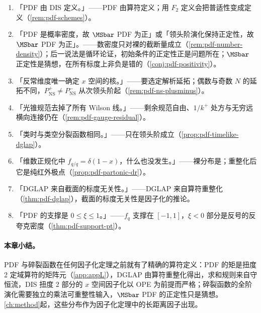 \begin{tcolorbox}[enhanced,breakable,title=本章澄清的常见误解,fonttitle=\bfseries,
  colback=gray!3!white,colframe=gray!55!black,boxrule=0.6pt,arc=2pt,
  left=5pt,right=5pt,top=3pt,bottom=3pt,before skip=8pt,after skip=6pt]
\begin{enumerate}[leftmargin=1.6em,itemsep=1pt,topsep=1pt,label=\arabic*.]
\item 「PDF 由 DIS 定义。」——PDF 由算符定义；用 $F_2$ 定义会把普适性变成定义（\cref{rem:pdf-schemes}）。
\item 「PDF 是概率密度，故 $\MSbar$ PDF 为正」或「领头阶演化保持正定性，故 $\MSbar$ PDF 为正」。——数密度只对裸的截断量成立（\cref{rem:pdf-number-density}）；后一说法是循环论证，初始条件的正定性正是问题所在；$\MSbar$ 正定性是猜想，在所有标度上非负是错的（\cref{conj:pdf-positivity}）。
\item 「反常维度唯一确定 $x$ 空间的核。」——要选定解析延拓；偶数与奇数 $N$ 的延拓不同，$P^+_{\mathrm{NS}}\ne P^-_{\mathrm{NS}}$ 从次领头阶起（\cref{rem:pdf-ns-plusminus}）。
\item 「光锥规范去掉了所有 Wilson 线。」——剩余规范自由、$1/k^+$ 处方与无穷远横向连接仍在（\cref{rem:pdf-gauge-residual}）。
\item 「类时与类空分裂函数相同。」——只在领头阶成立（\cref{prop:pdf-timelike-dglap}）。
\item 「维数正规化中 $f_{q/q}=\delta(1-x)$，什么也没发生。」——裸分布是；重整化后它是纯红外极点（\cref{prop:pdf-partonic-dr}）。
\item 「DGLAP 来自截面的标度无关性。」——DGLAP 来自算符重整化（\cref{thm:pdf-dglap}），截面的标度无关性是因子化的推论。
\item 「PDF 的支撑是 $0\le\xi\le1$。」——$f_q$ 支撑在 $[-1,1]$，$\xi<0$ 部分是反号的反夸克密度（\cref{thm:pdf-support-pt}）。
\end{enumerate}
\end{tcolorbox}

\paragraph{本章小结。}
PDF 与碎裂函数在任何因子化定理之前就有了精确的算符定义：PDF 的矩是扭度 2 定域算符的矩阵元（\cref{app:appL}），DGLAP 由算符重整化得出，求和规则来自守恒流，DIS 扭度 2 部分的 $x$ 空间因子化以 OPE 为前提而严格；碎裂函数的全阶演化需要独立的乘法可重整性输入，$\MSbar$ PDF 的正定性只是猜想。\cref{ch:method}起，这些分布作为因子化定理中的长距离因子出现。
